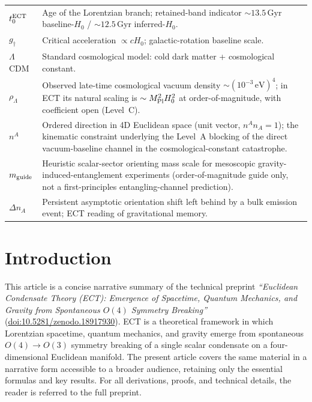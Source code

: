 \documentclass[11pt,a4paper]{article}
\begin{document}
\begin{longtable}{@{}p{2.6cm}p{12.6cm}@{}}
$t_0^{\rm ECT}$ & Age of the Lorentzian branch; retained-band indicator $\sim 13.5$\,Gyr baseline-$H_0$ / $\sim 12.5$\,Gyr inferred-$H_0$. \\
$g_\dagger$ & Critical acceleration $\propto cH_0$; galactic-rotation baseline scale. \\
$\Lambda$CDM & Standard cosmological model: cold dark matter + cosmological constant. \\
$\rho_\Lambda$ & Observed late-time cosmological vacuum density $\sim (10^{-3}\,\text{eV})^4$; in ECT its natural scaling is $\sim M_{\rm Pl}^2 H_0^2$ at order-of-magnitude, with coefficient open (Level~C). \\
$n^A$ & Ordered direction in 4D Euclidean space (unit vector, $n^A n_A=1$); the kinematic constraint underlying the Level~A blocking of the direct vacuum-baseline channel in the cosmological-constant catastrophe. \\
$m_{\rm guide}$ & Heuristic scalar-sector orienting mass scale for mesoscopic gravity-induced-entanglement experiments (order-of-magnitude guide only, not a first-principles entangling-channel prediction). \\
$\Delta n_A$ & Persistent asymptotic orientation shift left behind by a bulk emission event; ECT reading of gravitational memory. \\
\end{longtable}

\newpage
\setcounter{tocdepth}{2}
\tableofcontents
\newpage

\section*{Introduction}

This article is a concise narrative summary of the technical preprint \emph{``Euclidean Condensate Theory (ECT): Emergence of Spacetime, Quantum Mechanics, and Gravity from Spontaneous $O(4)$ Symmetry Breaking''} (\href{https://doi.org/10.5281/zenodo.18917930}{doi:10.5281/zenodo.18917930}). ECT is a theoretical framework in which Lorentzian spacetime, quantum mechanics, and gravity emerge from spontaneous $O(4)\to O(3)$ symmetry breaking of a single scalar condensate on a four-dimensional Euclidean manifold. The present article covers the same material in a narrative form accessible to a broader audience, retaining only the essential formulas and key results. For all derivations, proofs, and technical details, the reader is referred to the full preprint.
\end{document}
